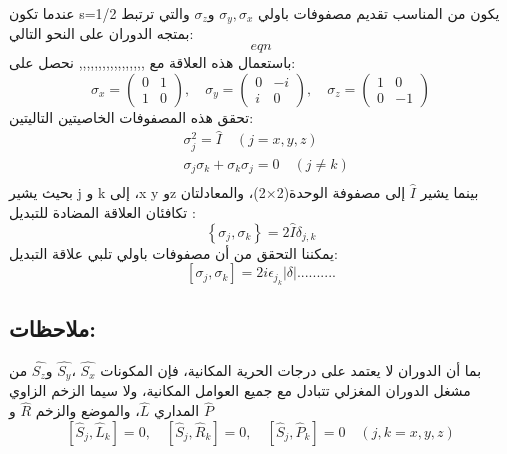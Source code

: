 عندما تكون s=1/2 يكون من المناسب تقديم مصفوفات باولي 
$ \sigma_y , \sigma_x$
و$ \sigma_z$
 والتي ترتبط بمتجه الدوران على النحو التالي:
\begin{equation}
	eqn
\end{equation}
باستعمال هذه العلاقة مع ,,,,,,,,,,,,,,,,, نحصل على:
\begin{equation}
	 \sigma_x=\left(\begin{array}{cc}
		0 & 1 \\
		1 & 0
	\end{array}\right), \quad \sigma_y=\left(\begin{array}{cc}
		0 & -i \\
		i & 0
	\end{array}\right), \quad \sigma_z=\left(\begin{array}{cc}
		1 & 0 \\
		0 & -1
	\end{array}\right) 
\end{equation}
تحقق هذه المصفوفات الخاصيتين التاليتين:
\begin{equation}
	\begin{aligned}
		& \sigma_j^2=\hat{I} \quad(j=x, y, z) \\
		& \sigma_j \sigma_k+\sigma_k \sigma_j=0 \quad(j \neq k) \\
		&
	\end{aligned}
\end{equation}
 بحيث يشير j  و k إلى ،x
y
وz
بينما يشير  $ \hat{I}$ إلى مصفوفة الوحدة(2×2)، والمعادلتان   تكافئان العلاقة المضادة للتبديل :
\begin{equation}
	\left\{\sigma_j, \sigma_k\right\}=2 \hat{I} \delta_{j, k} 
\end{equation}
يمكننا التحقق من أن مصفوفات باولي تلبي علاقة التبديل:
\begin{equation}
	\left[\sigma_j, \sigma_k\right]=2i\epsilon_{j_k}|\delta|..........
\end{equation}
\subsection*{ملاحظات:}

بما أن الدوران لا يعتمد على درجات الحرية المكانية، فإن المكونات  $\hat{S_{x}}$  ،$\hat{S_{y}}$ و$\hat{S_{z}}$
من مشغل الدوران المغزلي تتبادل مع جميع العوامل المكانية، ولا سيما الزخم الزاوي المداري $ \hat{L}$، والموضع والزخم $ \hat{R}$ و  $ \hat{P}$
\begin{equation}
	 \left[\hat{S}_j, \hat{L}_k\right]=0, \quad\left[\hat{S}_j, \hat{R}_k\right]=0, \quad\left[\hat{S}_j, \hat{P}_k\right]=0 \quad(j, k=x, y, z)
\end{equation}


